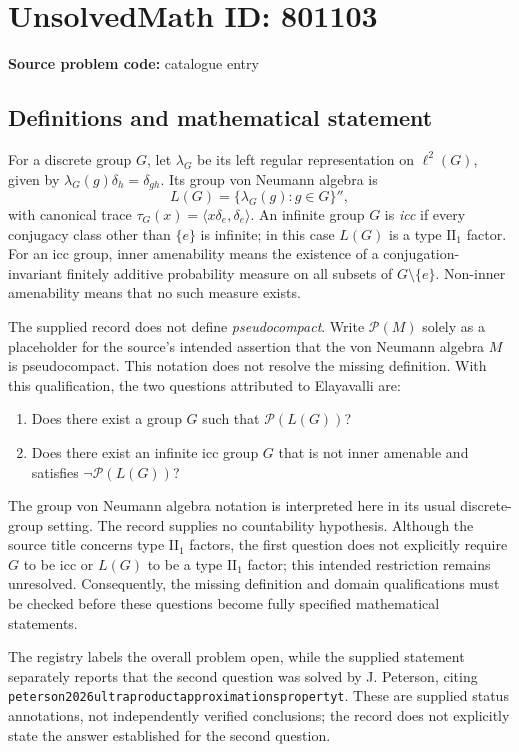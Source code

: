 \documentclass[11pt]{article}
\begin{document}
\section*{UnsolvedMath ID: 801103}
\textbf{Source problem code:} catalogue entry
\subsection{Definitions and mathematical statement}
For a discrete group \(G\), let \(\lambda_G\) be its left regular representation on \(\ell^2(G)\), given by \(\lambda_G(g)\delta_h=\delta_{gh}\). Its group von Neumann algebra is
\[
L(G)=\{\lambda_G(g):g\in G\}'',
\]
with canonical trace \(\tau_G(x)=\langle x\delta_e,\delta_e\rangle\). An infinite group \(G\) is \emph{icc} if every conjugacy class other than \(\{e\}\) is infinite; in this case \(L(G)\) is a type \(\mathrm{II}_1\) factor. For an icc group, inner amenability means the existence of a conjugation-invariant finitely additive probability measure on all subsets of \(G\setminus\{e\}\). Non-inner amenability means that no such measure exists.

The supplied record does not define \emph{pseudocompact}. Write \(\mathcal P(M)\) solely as a placeholder for the source's intended assertion that the von Neumann algebra \(M\) is pseudocompact. This notation does not resolve the missing definition. With this qualification, the two questions attributed to Elayavalli are:
\begin{enumerate}
\item Does there exist a group \(G\) such that \(\mathcal P(L(G))\)?
\item Does there exist an infinite icc group \(G\) that is not inner amenable and satisfies \(\neg\mathcal P(L(G))\)?
\end{enumerate}
The group von Neumann algebra notation is interpreted here in its usual discrete-group setting. The record supplies no countability hypothesis. Although the source title concerns type \(\mathrm{II}_1\) factors, the first question does not explicitly require \(G\) to be icc or \(L(G)\) to be a type \(\mathrm{II}_1\) factor; this intended restriction remains unresolved. Consequently, the missing definition and domain qualifications must be checked before these questions become fully specified mathematical statements.

The registry labels the overall problem open, while the supplied statement separately reports that the second question was solved by J. Peterson, citing \texttt{peterson2026ultraproductapproximationspropertyt}. These are supplied status annotations, not independently verified conclusions; the record does not explicitly state the answer established for the second question.
\end{document}
